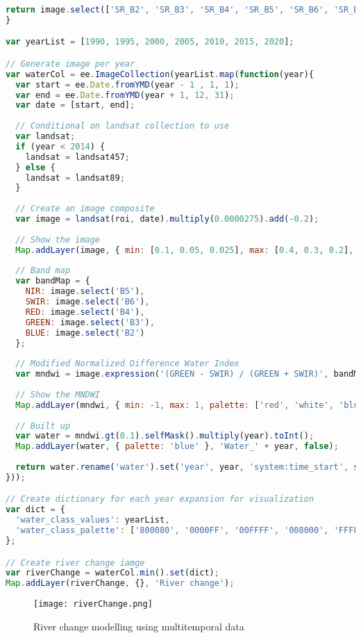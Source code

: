 \begin{lstlisting}[language=JavaScript, label={code:riverChange}, caption={GEE script to model river change}]
  return image.select(['SR_B2', 'SR_B3', 'SR_B4', 'SR_B5', 'SR_B6', 'SR_B7'], ['B2', 'B3', 'B4', 'B5', 'B6', 'B7']).updateMask(mask);
}

var yearList = [1990, 1995, 2000, 2005, 2010, 2015, 2020];

// Generate image per year
var waterCol = ee.ImageCollection(yearList.map(function(year){
  var start = ee.Date.fromYMD(year - 1 , 1, 1);
  var end = ee.Date.fromYMD(year + 1, 12, 31);
  var date = [start, end];
  
  // Conditional on landsat collection to use
  var landsat;
  if (year < 2014) {
    landsat = landsat457;
  } else {
    landsat = landsat89;
  }
  
  // Create an image composite
  var image = landsat(roi, date).multiply(0.0000275).add(-0.2);
  
  // Show the image
  Map.addLayer(image, { min: [0.1, 0.05, 0.025], max: [0.4, 0.3, 0.2], bands: ['B5', 'B6', 'B7'] }, 'Landsat_' + year, false);
  
  // Band map
  var bandMap = { 
    NIR: image.select('B5'), 
    SWIR: image.select('B6'), 
    RED: image.select('B4'), 
    GREEN: image.select('B3'), 
    BLUE: image.select('B2') 
  };
  
  // Modified Normalized Difference Water Index
  var mndwi = image.expression('(GREEN - SWIR) / (GREEN + SWIR)', bandMap).rename('MNDWI');
  
  // Show the MNDWI
  Map.addLayer(mndwi, { min: -1, max: 1, palette: ['red', 'white', 'blue'] }, 'MNDWI_' + year, false);
  
  // Built up
  var water = mndwi.gt(0.1).selfMask().multiply(year).toInt();
  Map.addLayer(water, { palette: 'blue' }, 'Water_' + year, false);
  
  return water.rename('water').set('year', year, 'system:time_start', start);
}));

// Create dictionary for each year expansion for visualization
var dict = {
  'water_class_values': yearList,
  'water_class_palette': ['800080', '0000FF', '00FFFF', '008000', 'FFFF00', 'FFA500', 'FF0000']
};

// Create river change iamge
var riverChange = waterCol.min().set(dict);
Map.addLayer(riverChange, {}, 'River change');
\end{lstlisting}

\begin{figure}[htbp]
	\label{fig:riverChange}
	\centering
	\texttt{[image: riverChange.png]}
	\caption{River change modelling using multitemporal data}
\end{figure}


